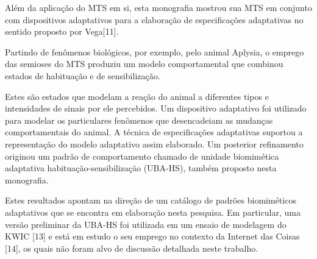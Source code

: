 Além da aplicação do MTS em si, esta monografia mostrou sua MTS em conjunto com dispositivos adaptativos para a elaboração de especificações adaptativas no sentido proposto por Vega[11].

Partindo de fenômenos biológicos, por exemplo, pelo animal Aplysia, o emprego das semioses do MTS produziu um modelo comportamental que combinou estados de habituação e de sensibilização.

Estes são estados que modelam a reação do animal a diferentes tipos e intensidades de sinais por ele percebidos. Um dispositivo adaptativo foi utilizado para modelar os particulares fenômenos que desencadeiam as mudanças comportamentais do animal. A técnica de especificações adaptativas suportou a representação do modelo adaptativo assim elaborado. Um posterior refinamento originou um padrão de comportamento chamado de unidade biomimética adaptativa habituação-sensibilização (UBA-HS), também proposto nesta monografia.

Estes resultados apontam na direção de um catálogo de padrões biomiméticos adaptativos que se encontra em elaboração nesta pesquisa. Em particular, uma versão preliminar da UBA-HS foi utilizada em um ensaio de modelagem do KWIC [13] e está em estudo o seu emprego no contexto da Internet das Coisas [14], os quais não foram alvo de discussão detalhada neste trabalho.
